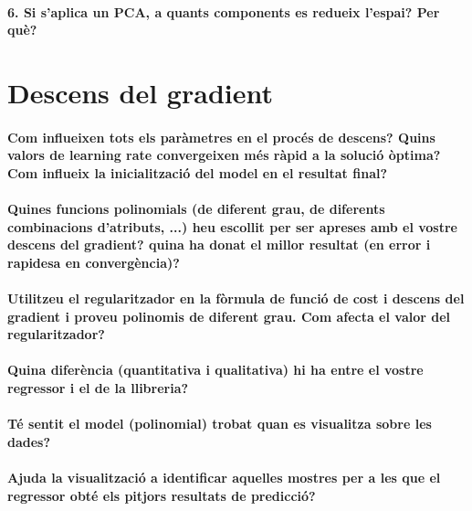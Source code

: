 \documentclass[a4paper, 11pt]{article}
\begin{document}
        \paragraph{6. Si s'aplica un PCA, a quants components es redueix l'espai? Per què?}

    \section{Descens del gradient}
        \paragraph{Com influeixen tots els paràmetres en el procés de descens? Quins valors de
        learning rate convergeixen més ràpid a la solució òptima? Com influeix la inicialització
        del model en el resultat final?}


        \paragraph{Quines funcions polinomials (de diferent grau, de diferents combinacions
        d'atributs, ...) heu escollit per ser apreses amb el vostre descens del gradient? quina ha
        donat el millor resultat (en error i rapidesa en convergència)?}

        \paragraph{Utilitzeu el regularitzador en la fòrmula de funció de cost i descens del
        gradient i proveu polinomis de diferent grau. Com afecta el valor del regularitzador?}

        \paragraph{Quina diferència (quantitativa i qualitativa) hi ha entre el vostre regressor
        i el de la llibreria?}

        \paragraph{Té sentit el model (polinomial) trobat quan es visualitza sobre les dades?}

        \paragraph{Ajuda la visualització a identificar aquelles mostres per a les que el regressor
        obté els pitjors resultats de predicció?}
\end{document}
